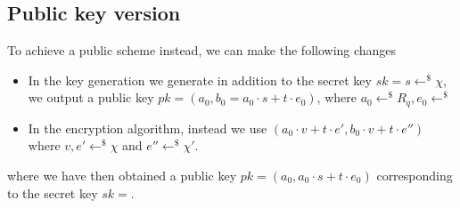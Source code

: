\documentclass[../main.tex]{subfiles}
\begin{document}
\subsection{Public key version}
To achieve a public scheme instead, we can make the following changes
\begin{itemize}
    \item In the key generation we generate in addition to the secret key $sk = s \leftarrow^{\$} \chi$, we output a public key
          $pk = (a_0 , b_0 = a_0 \cdot s + t \cdot e_0)$, where $a_0 \leftarrow^{\$} R_q, e_0 \leftarrow^{\$}$
    \item In the encryption algorithm, instead we use
          $(a_0 \cdot v + t \cdot e', b_0 \cdot v + t \cdot e'')$ where
          $v, e' \leftarrow^{\$} \chi$ and $e'' \leftarrow^{\$} \chi '$.
\end{itemize}
where we have then obtained a public key $pk = (a_0, a_0 \cdot s + t \cdot e_0)$
corresponding to the secret key $sk = $.
\end{document}
